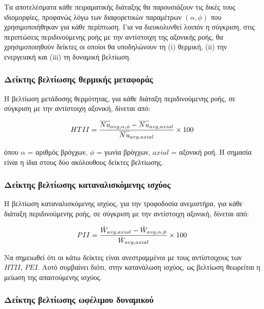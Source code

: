 \noindent Τα αποτελέσματα κάθε πειραματικής διάταξης θα παρουσιάζουν τις δικές τους ιδιομορφίες, προφανώς λόγω των διαφορετικών παραμέτρων $\left(\alpha, \phi \right)$ που χρησιμοποιήθηκαν για κάθε περίπτωση. Για να διευκολυνθεί λοιπόν η σύγκριση, στις περιπτώσεις περιδινούμενης ροής με την αντίστοιχη της αξονικής ροής, θα χρησιμοποιηθούν δείκτες οι οποίοι θα υποδηλώνουν τη (i) θερμική, (ii) την ενεργειακή και (iii) τη δυναμική βελτίωση. 

\subsubsection{Δείκτης βελτίωσης θερμικής μεταφοράς}

\noindent Η βελτίωση μετάδοσης θερμότητας, για κάθε διάταξη περιδινούμενης ροής, σε σύγκριση με την αντίστοιχη αξονική, δίνεται από:

\begin{equation}\label{eq:htii}
HTII = \displaystyle\frac{\overline{Nu}_{\scriptsize{avg, \alpha, \phi}} - \overline{Nu}_{\scriptsize{avg, axial}}}{\overline{Nu}_{\scriptsize{avg, axial}}} \times 100
\end{equation}

\noindent όπου $\alpha$ = αριθμός βρόγχων, $\phi$ = γωνία βρόγχων, $axial$ = αξονική ροή. Η σημασία είναι η ίδια στους δύο ακόλουθους δείκτες βελτίωσης.

\subsubsection{Δείκτης βελτίωσης καταναλισκόμενης ισχύος}

\noindent Η βελτίωση καταναλισκόμενης ισχύος, για την τροφοδοσία ανεμιστήρα, για κάθε διάταξη περιδινούμενης ροής, σε σύγκριση με την αντίστοιχη αξονική, δίνεται από:

\begin{equation}\label{eq:pii}
PII = \displaystyle\frac{\dot{W}_{\scriptsize{avg, axial}} - \dot{W}_{\scriptsize{avg, \alpha, \phi}}}{\dot{W}_{\scriptsize{avg, axial}}} \times 100
\end{equation}

\noindent Να σημειωθεί ότι οι κάτω δείκτες είναι ανεστραμμένοι με τους αντίστοιχους των $HTII$,  $PEI$. Αυτό συμβαίνει διότι, στην κατανάλωση ισχύος, ως βελτίωση θεωρείται η μείωση της απαιτούμενης ισχύος.

\subsubsection{Δείκτης βελτίωσης ωφέλιμου δυναμικού} 
 
